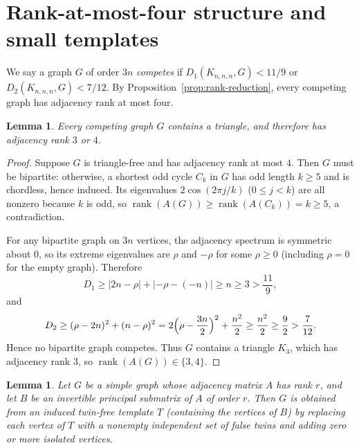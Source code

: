 \documentclass[10pt]{article}
\newtheorem{lemma}[theorem]{Lemma}
\begin{document}
\section{Rank-at-most-four structure and small templates}

We say a graph $G$ of order $3n$ \emph{competes} if $D_1(K_{n,n,n}, G) < 11/9$ or $D_2(K_{n,n,n}, G) < 7/12$. By Proposition~\ref{prop:rank-reduction}, every competing graph has adjacency rank at most four.

\begin{lemma}\label{lem:triangle}
Every competing graph $G$ contains a triangle, and therefore has adjacency rank $3$ or $4$.
\end{lemma}

\begin{proof}
Suppose $G$ is triangle-free and has adjacency rank at most $4$. Then $G$ must be bipartite: otherwise, a shortest odd cycle $C_k$ in $G$ has odd length $k \geq 5$ and is chordless, hence induced. Its eigenvalues $2\cos(2\pi j/k)$ ($0 \leq j < k$) are all nonzero because $k$ is odd, so $\operatorname{rank}(A(G)) \geq \operatorname{rank}(A(C_k)) = k \geq 5$, a contradiction.

For any bipartite graph on $3n$ vertices, the adjacency spectrum is symmetric about $0$, so its extreme eigenvalues are $\rho$ and $-\rho$ for some $\rho \geq 0$ (including $\rho = 0$ for the empty graph). Therefore
\[
D_1 \geq |2n - \rho| + |-\rho - (-n)| \geq n \geq 3 > \frac{11}{9},
\]
and
\[
D_2 \geq (\rho - 2n)^2 + (n - \rho)^2 = 2\Bigl(\rho - \frac{3n}{2}\Bigr)^2 + \frac{n^2}{2} \geq \frac{n^2}{2} \geq \frac{9}{2} > \frac{7}{12}.
\]
Hence no bipartite graph competes. Thus $G$ contains a triangle $K_3$, which has adjacency rank $3$, so $\operatorname{rank}(A(G)) \in \{3, 4\}$.
\end{proof}

\begin{lemma}\label{lem:blowup}
Let $G$ be a simple graph whose adjacency matrix $A$ has rank $r$, and let $B$ be an invertible principal submatrix of $A$ of order $r$. Then $G$ is obtained from an induced twin-free template $T$ (containing the vertices of $B$) by replacing each vertex of $T$ with a nonempty independent set of false twins and adding zero or more isolated vertices.
\end{lemma}
\end{document}
